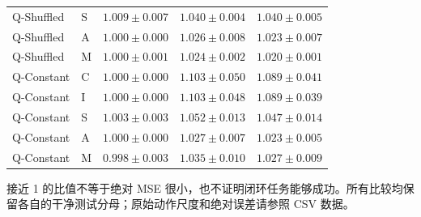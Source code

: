 \documentclass[11pt,a4paper,fontset=fandol]{ctexart}
\newcommand{\note}[1]{\begin{tcolorbox}[colback=panel,colframe=rule,boxrule=0.5pt,arc=1mm]#1\end{tcolorbox}}
\begin{document}
\begin{center}
\begin{tabular}{llrrr}
Q-Shuffled & S & $1.009\pm0.007$ & $1.040\pm0.004$ & $1.040\pm0.005$ \\
Q-Shuffled & A & $1.000\pm0.000$ & $1.026\pm0.008$ & $1.023\pm0.007$ \\
Q-Shuffled & M & $1.000\pm0.001$ & $1.024\pm0.002$ & $1.020\pm0.001$ \\
Q-Constant & C & $1.000\pm0.000$ & $1.103\pm0.050$ & $1.089\pm0.041$ \\
Q-Constant & I & $1.000\pm0.000$ & $1.103\pm0.048$ & $1.089\pm0.039$ \\
Q-Constant & S & $1.003\pm0.003$ & $1.052\pm0.013$ & $1.047\pm0.014$ \\
Q-Constant & A & $1.000\pm0.000$ & $1.027\pm0.007$ & $1.023\pm0.005$ \\
Q-Constant & M & $0.998\pm0.003$ & $1.035\pm0.010$ & $1.027\pm0.009$ \\
\bottomrule
\end{tabular}
\end{center}
\note{接近 1 的比值不等于绝对 MSE 很小，也不证明闭环任务能够成功。所有比较均保留各自的干净测试分母；原始动作尺度和绝对误差请参照 CSV 数据。}
\end{document}
